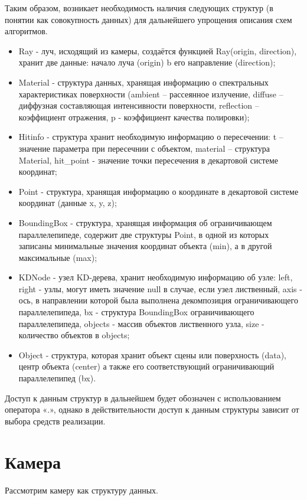 Таким образом, возникает необходимость наличия следующих структур (в понятии как совокупность данных) для дальнейшего упрощения описания схем алгоритмов.

\begin{itemize}
	\item Ray - луч, исходящий из камеры, создаётся функцией Ray(origin, direction), хранит две данные: начало луча (origin) b его направление (direction);
	\item Material - структура данных, хранящая информацию о спектральных характеристиках поверхности (ambient -- рассеянное излучение, diffuse -- диффузная составляющая интенсивности поверхности, reflection -- коэффициент отражения, p - коэффициент качества полировки);
	\item Hitinfo - структура хранит необходимую информацию о пересечении: t -- значение параметра при пересечнии с объектом, material -- структура Material, hit\_point - значение точки пересечения в декартовой системе координат;
	\item Point - структура, хранящая информацию о координате в декартовой системе координат (данные x, y, z);
	\item BoundingBox - структура, хранящая информация об ограничивающем параллелепипеде, содержит две структуры Point, в одной из которых записаны минимальные значения координат объекта (min), а в другой максимальные (max);
	\item KDNode - узел KD-дерева, хранит необходимую информацию об узле: left, right - узлы, могут иметь значение null в случае, если узел лиственный, axis - ось, в направлении которой была выполнена декомпозиция ограничивающего параллелепипеда, bx - структура BoundingBox ограничивающего параллелепипеда, objects - массив объектов лиственного узла, size - количество объектов в objects;
	\item Object - структура, которая хранит объект сцены или поверхность (data), центр объекта (center) а также его соответствующий ограничивающий параллелепипед (bx).
\end{itemize}

Доступ к данным структур в дальнейшем будет обозначен с использованием оператора «.», однако в действительности доступ к данным структуры зависит от выбора средств реализации.

\section{Камера}

Рассмотрим камеру как структуру данных.

